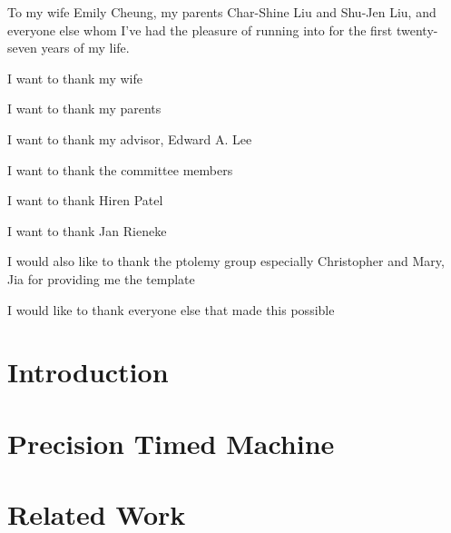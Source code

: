 \documentclass[11pt]{ucthesis}
\begin{document}
\begin{frontmatter}

\begin{dedication}
\null\vfil
{\large
\begin{center}
To my wife Emily Cheung, my parents Char-Shine Liu and Shu-Jen Liu, and everyone else whom
I've had the pleasure of running into for the first twenty-seven years of my
life.
\end{center}}
\vfil\null
\end{dedication}

\tableofcontents
\listoffigures
\listoftables
\begin{acknowledgements}

I want to thank my wife

I want to thank my parents

I want to thank my advisor, Edward A. Lee

I want to thank the committee members

I want to thank Hiren Patel

I want to thank Jan Rieneke

I would also like to thank the ptolemy group especially Christopher and Mary, Jia for providing me the template

I would like to thank everyone else that made this possible

\end{acknowledgements}

\end{frontmatter}

\chapter{Introduction}
\label{chapter:intro}


\chapter{Precision Timed Machine}
\label{chapter:pret}


\chapter{Related Work}
\label{chapter:related}

\end{document}
